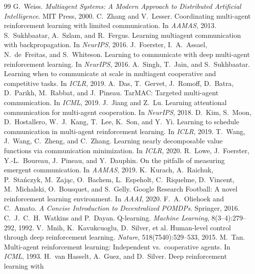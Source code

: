 \documentclass[twocolumn]{article}
\begin{document}
\newpage   %
\small
\begin{thebibliography}{99}
\setlength{\itemsep}{1pt}
 G.~Weiss. \emph{Multiagent Systems: A Modern Approach to Distributed Artificial
Intelligence}. MIT Press, 2000.
 C.~Zhang and V.~Lesser. Coordinating multi-agent reinforcement learning with
limited communication. In \emph{AAMAS}, 2013.
 S.~Sukhbaatar, A.~Szlam, and R.~Fergus. Learning multiagent communication
with backpropagation. In \emph{NeurIPS}, 2016.
 J.~Foerster, I.~A.~Assael, N.~de~Freitas, and S.~Whiteson. Learning to
communicate with deep multi-agent reinforcement learning. In \emph{NeurIPS}, 2016.
 A.~Singh, T.~Jain, and S.~Sukhbaatar. Learning when to communicate at scale in
multiagent cooperative and competitive tasks. In \emph{ICLR}, 2019.
 A.~Das, T.~Gervet, J.~Romoff, D.~Batra, D.~Parikh, M.~Rabbat, and J.~Pineau.
TarMAC: Targeted multi-agent communication. In \emph{ICML}, 2019.
 J.~Jiang and Z.~Lu. Learning attentional communication for multi-agent
cooperation. In \emph{NeurIPS}, 2018.
 D.~Kim, S.~Moon, D.~Hostallero, W.~J.~Kang, T.~Lee, K.~Son, and Y.~Yi. Learning to
schedule communication in multi-agent reinforcement learning. In \emph{ICLR}, 2019.
 T.~Wang, J.~Wang, C.~Zheng, and C.~Zhang. Learning nearly decomposable value
functions via communication minimization. In \emph{ICLR}, 2020.
 R.~Lowe, J.~Foerster, Y.-L.~Boureau, J.~Pineau, and Y.~Dauphin. On the pitfalls of
measuring emergent communication. In \emph{AAMAS}, 2019.
 K.~Kurach, A.~Raichuk, P.~Sta\'nczyk, M.~Zaj\k{a}c, O.~Bachem, L.~Espeholt,
C.~Riquelme, D.~Vincent, M.~Michalski, O.~Bousquet, and S.~Gelly. Google Research Football: A novel
reinforcement learning environment. In \emph{AAAI}, 2020.
 F.~A.~Oliehoek and C.~Amato. \emph{A Concise Introduction to Decentralized
POMDPs}. Springer, 2016.
 C.~J.~C.~H.~Watkins and P.~Dayan. Q-learning. \emph{Machine Learning},
8(3--4):279--292, 1992.
 V.~Mnih, K.~Kavukcuoglu, D.~Silver, et al. Human-level control through deep
reinforcement learning. \emph{Nature}, 518(7540):529--533, 2015.
 M.~Tan. Multi-agent reinforcement learning: Independent vs.\ cooperative agents.
In \emph{ICML}, 1993.
 H.~van Hasselt, A.~Guez, and D.~Silver. Deep reinforcement learning with

\end{thebibliography}
\end{document}
